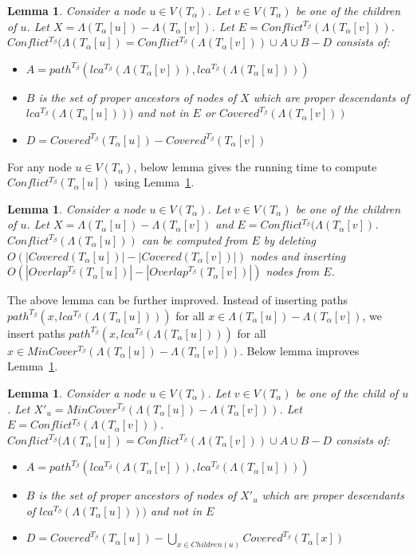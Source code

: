 \documentclass[final,1p,times]{elsarticle}
\newcommand{\TA}{T_\alpha}
\newcommand{\TB}{T_\beta}
\newtheorem{lemma}[theorem]{Lemma}
\begin{document}
    \begin{lemma}
	    \label{lem-build-Conflict1}
	    Consider a node $u \in V(\TA)$. Let $v \in V(\TA)$ be one of the children of $u$. Let $X=\Lambda(\TA[u])-\Lambda(\TA[v])$. Let $E=Conflict^{\TB}(\Lambda(\TA[v]))$.
	    $Conflict^{\TB}(\Lambda(\TA[u]) = Conflict^{\TB}(\Lambda(\TA[v])) \cup A \cup B - D$ consists of:
	\begin{itemize}
		\item $A = path^{T_{\beta}}(lca^{\TB}(\Lambda(\TA[v])), lca^{\TB}(\Lambda(\TA[u])))$
		\item $B$ is the set of proper ancestors of nodes of $X$ which are proper descendants of $lca^{T_{\beta}}(\Lambda(\TA[u])))$ and not in $E$ or $Covered^{\TB}(\Lambda(\TA[v]))$
		\item $D = Covered^{\TB}(\TA[u]) - Covered^{\TB}(\TA[v])$
	\end{itemize}
    \end{lemma}

    For any node $u \in V(\TA)$, below lemma gives the running time to compute $Conflict^{\TB}(\TA[u])$ using Lemma~\ref{lem-build-Conflict1}.
    \begin{lemma}
	    \label{lem-time-build-Conflict1}
	    Consider a node $u \in V(\TA)$. Let $v \in V(\TA)$ be one of the children of $u$. Let $X=\Lambda(\TA[u])-\Lambda(\TA[v])$ and $E = Conflict^{\TB}(\Lambda(\TA[v])$.
	    $Conflict^{\TB}(\Lambda(\TA[u]))$ can be computed from $E$ by deleting $O(|Covered(\TA[u])| - |Covered(\TA[v])|)$ nodes and inserting $O(|Overlap^{\TB}(\TA[u])| - |Overlap^{\TB}(\TA[v])|)$ nodes from $E$.
    \end{lemma}

    The above lemma can be further improved. Instead of inserting paths $path^{T_{\beta}}(x, lca^{T_{\beta}}(\Lambda(\TA[u])))$ for all $x \in \Lambda(\TA[u]) - \Lambda(\TA[v])$,
    we insert paths $path^{T_{\beta}}(x, lca^{T_{\beta}}(\Lambda(\TA[u])))$ for all $x \in MinCover^{T_{\beta}}(\Lambda(\TA[u]) - \Lambda(\TA[v]))$. Below lemma improves Lemma~\ref{lem-time-build-Conflict1}.

    \begin{lemma}
	    \label{lem-build-Conflict2}
	    Consider a node $u \in V(\TA)$. Let $v \in V(\TA)$ be one of the child of $u$. Let $X'_u=MinCover^{T_{\beta}}(\Lambda(\TA[u])-\Lambda(\TA[v]))$. Let $E=Conflict^{\TB}(\Lambda(\TA[v]))$.
	    $Conflict^{\TB}(\Lambda(\TA[u]) = Conflict^{\TB}(\Lambda(\TA[v])) \cup A \cup B - D$ consists of:
	\begin{itemize}
		\item $A = path^{T_{\beta}}(lca^{\TB}(\Lambda(\TA[v])), lca^{\TB}(\Lambda(\TA[u])))$
		\item $B$ is the set of proper ancestors of nodes of $X'_u$ which are proper descendants of $lca^{T_{\beta}}(\Lambda(\TA[u])))$ and not in $E$
		\item $D = Covered^{\TB}(\TA[u]) - \bigcup_{x \in Children(u)} Covered^{\TB}(\TA[x])$
	\end{itemize}
    \end{lemma}
\end{document}
